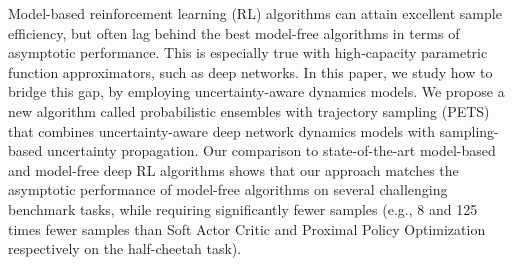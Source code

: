Model-based reinforcement learning (RL) algorithms can attain excellent sample efficiency, but often lag behind the best model-free algorithms in terms of asymptotic performance. This is especially true with high-capacity parametric function approximators, such as deep networks. In this paper, we study how to bridge this gap, by employing uncertainty-aware dynamics models. We propose a new algorithm called probabilistic ensembles with trajectory sampling (PETS) that combines uncertainty-aware deep network dynamics models with sampling-based uncertainty propagation. Our comparison to state-of-the-art model-based and model-free deep RL algorithms shows that our approach matches the asymptotic performance of model-free algorithms on several challenging benchmark tasks, while requiring significantly fewer samples (e.g., 8 and 125 times fewer samples than Soft Actor Critic and Proximal Policy Optimization respectively on the half-cheetah task).

